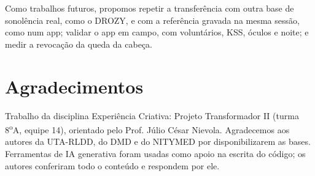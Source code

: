 \documentclass[conference]{IEEEtran}
\begin{document}
Como trabalhos futuros, propomos repetir a transferência com outra base de sonolência real, como o DROZY, e com a referência gravada na mesma sessão, como num app; validar o app em campo, com voluntários, KSS, óculos e noite; e medir a revocação da queda da cabeça.

\section*{Agradecimentos}
Trabalho da disciplina Experiência Criativa: Projeto Transformador II (turma 8\textsuperscript{o}A, equipe 14), orientado pelo Prof. Júlio César Nievola. Agradecemos aos autores da UTA-RLDD, do DMD e do NITYMED por disponibilizarem as bases. Ferramentas de IA generativa foram usadas como apoio na escrita do código; os autores conferiram todo o conteúdo e respondem por ele.



\end{document}
